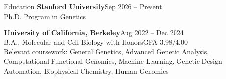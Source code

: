 \documentclass[letterpaper]{resume} %
\begin{document}
%
%
%
%
%
%


\begin{rSection}{Education}
\textbf{Stanford University}\notionsep Sep 2026 -- Present\\
{\color{notiongray}Ph.D. Program in Genetics}

\textbf{University of California, Berkeley}\notionsep Aug 2022 -- Dec 2024\\
{\color{notiongray}B.A., Molecular and Cell Biology with Honors\notionsep GPA 3.98/4.00}\\
Relevant coursework: General Genetics, Advanced Genetic Analysis, Computational Functional Genomics, Machine Learning, Genetic Design Automation, Biophysical Chemistry, Human Genomics
\end{rSection}
\end{document}
